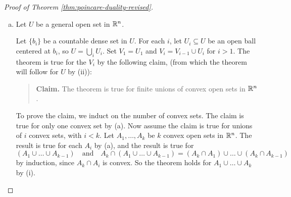 \begin{proof}[Proof of Theorem \ref{thm:poincare-duality-revised}]
\begin{enumerate}[(a)]
      If $p = n$, then
      $H^n(\R^n, \R^n - K_r) \cong R$ for
      all $r$. Thus the inclusions are
      isomorphisms, so
      \[H^n_c(\R^n; R) \cong R \quad \text{and} \quad
      H_0(\R^n) \cong R.\]
      Now consider $\alpha_{K_r} \cap \cdot : H^n(\R^n, \R^n - K_r) \to H_0(\R^n)$.
      Recall the formula
      \begin{align*}
        H^n(\R^n, \R^n - K_r) \times
        H^n(\R^n, \R^n - K_r)
        &\longrightarrow H_0(\R^n) \\
        (\alpha, \beta)
        &\longmapsto \beta({}_n\alpha) \alpha_0 = \beta(\alpha)
      \end{align*}
      where ${}_n\alpha$ denotes the the
      front $n$-face of $\alpha$. So
      the map $\alpha_{K_r} \cap \cdot$
      is given by $\beta \mapsto \beta(\alpha_{K_r})$.
      We know $\alpha_{K_r}$ is a generator
      of $H_n(\R^n, \R^n - K_r)$ (else it
      could not map to generators of
      $H_n(\R^n, \R^n - \{x\})$ for all
      $x \in K_r$). Let
      $\beta \in \Hom(H^n(\R^n, \R^n - K_r), R) \cong H^n(\R, \R^n - K_r)$
      that evaluates to $1$ on $\alpha_{K_r}$,
      so $\beta$ generates $H^n(\R^n, \R^n - K_r)$
      and $\alpha_{K_r} \cap \beta = \beta(\alpha_{K_r}) = 1 \in R$.

      Thus $\alpha_{K_r} \cap \cdot$ is an
      isomorphism, so the
      theorem is true for convex open sets
      in $\R^n$.
    \item Let $U$ be a general open set
      in $\R^n$.

      Let $\{b_i\}$ be a countable dense
      set in $U$. For each $i$, let $U_i \subseteq U$ be an
      open ball centered at $b_i$, so
      $U = \bigcup_i U_i$.
      Set $V_1 = U_1$ and
      $V_i = V_{i - 1} \cup U_i$ for
      $i > 1$. The theorem is true for the
      $V_i$ by the following claim, (from
      which the theorem will follow for $U$
      by (ii)):
      \begin{quote}
        \textbf{Claim.} The theorem is
        true for finite unions of convex
        open sets in $\R^n$.
      \end{quote}
      To prove the claim, we induct on the
      number of convex sets. The claim is
      true for only one convex set by (a).
      Now assume the claim is true
      for unions of $i$ convex sets, with
      $i < k$. Let $A_1, \dots, A_k$
      be $k$ convex open sets in $\R^n$.
      The result is true for each $A_i$
      by (a), and the result is true
      for
      \[
        (A_1 \cup \dots \cup A_{k - 1})
        \quad \text{and} \quad
        A_k \cap (A_1 \cup \dots \cup A_{k - 1})
        = (A_k \cap A_1) \cup \dots \cup (A_k \cap A_{k - 1})
      \]
      by induction, since
      $A_k \cap A_i$ is convex.
      So the theorem holds for
      $A_1 \cup \dots \cup A_k$ by (i).
  \end{enumerate}


\end{proof}
